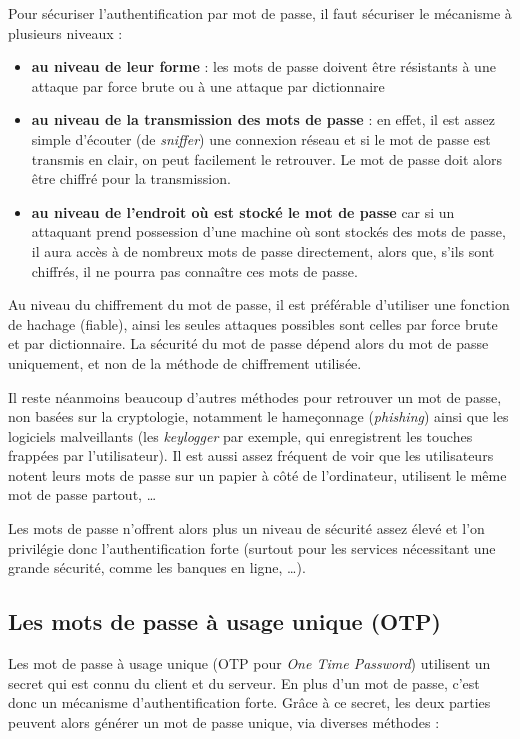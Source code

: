 Pour sécuriser l'authentification par mot de passe, il faut
sécuriser le mécanisme à plusieurs niveaux :
\begin{itemize}
  \item {\sffamily\textbf{au niveau de leur forme}} : les mots de
passe doivent 
être résistants à une attaque par force brute ou à une attaque 
par dictionnaire
  \item {\sffamily\textbf{au niveau de la transmission des mots de
passe}} : en effet,
il est assez simple d'écouter (de \emph{sniffer}) une connexion
réseau et si le mot de passe est transmis en clair, on peut
facilement le retrouver. Le mot de passe doit alors être chiffré
pour la transmission.
  \item {\sffamily\textbf{au niveau de l'endroit où est stocké le
mot de passe}} car
si un attaquant prend possession d'une machine où sont stockés
des mots de passe, il aura accès à de nombreux mots
de passe directement, alors que, s'ils sont
chiffrés, il ne pourra pas connaître ces mots de passe.
\\
\end{itemize}

Au niveau du chiffrement du mot de passe, il est préférable
d'utiliser une fonction de hachage (fiable), ainsi les seules
attaques possibles sont celles par force brute et par
dictionnaire. La sécurité du mot de passe dépend alors du mot de
passe uniquement, et non de la méthode de chiffrement utilisée.

Il reste néanmoins beaucoup d'autres méthodes pour retrouver un mot de
passe, non basées sur la cryptologie, notamment le hameçonnage
(\emph{phishing}) ainsi que les logiciels malveillants (les
\emph{keylogger} par exemple, qui enregistrent les touches
frappées par l'utilisateur). Il est aussi assez fréquent de voir
que les utilisateurs notent leurs mots de passe sur un papier à
côté de l'ordinateur, utilisent le même mot de passe partout, …

Les mots de passe n'offrent alors plus un niveau de sécurité assez
élevé et l'on privilégie donc l'authentification forte (surtout
pour les services nécessitant une grande sécurité, comme les
banques en ligne, …).

\subsection{Les mots de passe à usage unique (OTP)}
Les mot de passe à usage unique (OTP pour \emph{One Time
Password}) utilisent un secret qui est connu du client et du
serveur. En plus d'un mot de passe, c'est donc un mécanisme
d'authentification forte.
Grâce à ce secret, les deux parties peuvent alors générer
un mot de passe unique, via diverses méthodes : 

